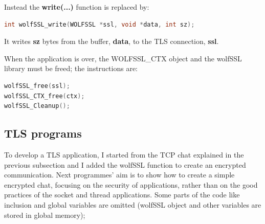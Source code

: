 \documentclass[a4paper,12pt]{article}
\begin{document}
Instead the \textbf{write(...)} function is replaced by:
\begin{lstlisting}[language=c]
int wolfSSL_write(WOLFSSL *ssl, void *data, int sz);
\end{lstlisting}
It writes \textbf{sz} bytes from the buffer, \textbf{data}, to the TLS connection, \textbf{ssl}.

When the application is over, the WOLFSSL\_CTX object and the wolfSSL library must be freed; the instructions are:
\begin{lstlisting}[language=c]
wolfSSL_free(ssl);
wolfSSL_CTX_free(ctx);
wolfSSL_Cleanup();
\end{lstlisting}


\subsection{TLS programs}
To develop a TLS application, I started from the TCP chat explained in the previous subsection and I added the wolfSSL function to create an encrypted communication.
Next programmes' aim is to show how to create a simple encrypted chat, focusing on the security of applications, rather than on the good practices of the socket and thread applications.
Some parts of the code like inclusion and global variables are omitted (wolfSSL object and other variables are stored in global memory); 
\end{document}
